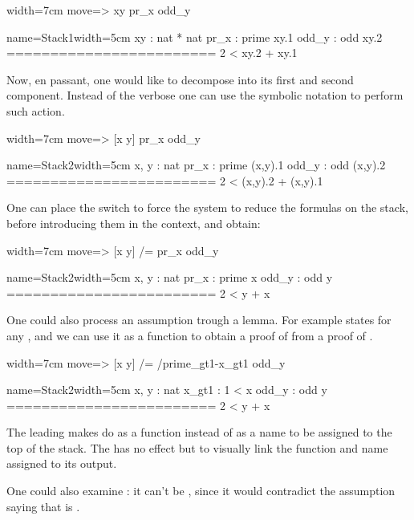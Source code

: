 \begin{coq}{}{width=7cm}
move=> xy pr_x odd_y
\end{coq}
\begin{coqout}{name=Stack1}{width=5cm}
 xy : nat * nat
 pr_x : prime xy.1
 odd_y : odd xy.2
========================
 2 < xy.2 + xy.1
\end{coqout}

Now, en passant, one would like to decompose  into its first
and second component.  Instead of the verbose 
one can use the symbolic notation \C{[]} to perform such action.

\begin{coq}{}{width=7cm}
move=> [x y] pr_x odd_y
\end{coq}
\begin{coqout}{name=Stack2}{width=5cm}
 x, y : nat
 pr_x : prime (x,y).1
 odd_y : odd (x,y).2
========================
 2 < (x,y).2 + (x,y).1
\end{coqout}

One can place the \C{/=} switch to force the system to reduce the formulas on
the stack, before introducing them in the context, and obtain:

\begin{coq}{}{width=7cm}
move=> [x y] /= pr_x odd_y
\end{coq}
\begin{coqout}{name=Stack2}{width=5cm}
 x, y : nat
 pr_x : prime x
 odd_y : odd y
========================
 2 < y + x
\end{coqout}

One could also process an assumption trough a lemma.  For example
 states  for any , and we can
use it as a function to obtain a proof of   from a proof
of .

\begin{coq}{}{width=7cm}
move=> [x y] /= /prime_gt1-x_gt1 odd_y
\end{coq}
\begin{coqout}{name=Stack2}{width=5cm}
 x, y : nat
 x_gt1 : 1 < x
 odd_y : odd y
========================
 2 < y + x
\end{coqout}

The leading \C{/} makes  do as a function instead of
as a name to be assigned to the top of the stack.  The \C{-} has no effect but
to visually link the function and name assigned to its output. 

One could also examine : it can't be , since it would contradict
the assumption saying that  is .

